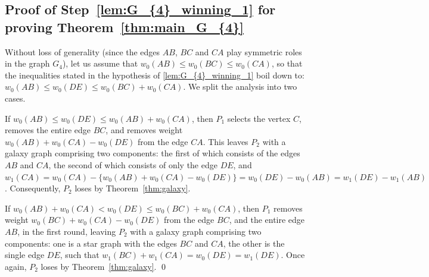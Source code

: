 \documentclass[11pt,reqno]{amsart}
\theoremstyle{definition}
\theoremstyle{definition}
\begin{document}
\subsection{Proof of Step~\ref{lem:G_{4}_winning_1} for proving Theorem~\ref{thm:main_G_{4}}}
Without loss of generality (since the edges $AB$, $BC$ and $CA$ play symmetric roles in the graph $G_{4}$), let us assume that $w_{0}(AB)\leqslant w_{0}(BC)\leqslant w_{0}(CA)$, so that the inequalities stated in the hypothesis of \eqref{lem:G_{4}_winning_1} boil down to: $w_{0}(AB) \leqslant w_{0}(DE) \leqslant w_{0}(BC)+w_{0}(CA)$. We split the analysis into two cases. 

If $w_{0}(AB)\leqslant w_{0}(DE)\leqslant w_{0}(AB)+w_{0}(CA)$, then $P_{1}$ selects the vertex $C$, removes the entire edge $BC$, and removes weight $w_{0}(AB)+w_{0}(CA)-w_{0}(DE)$ from the edge $CA$. This leaves $P_{2}$ with a galaxy graph comprising two components: the first of which consists of the edges $AB$ and $CA$, the second of which consists of only the edge $DE$, and $w_{1}(CA)=w_{0}(CA)-\{w_{0}(AB)+w_{0}(CA)-w_{0}(DE)\}=w_{0}(DE)-w_{0}(AB)=w_{1}(DE)-w_{1}(AB)$. Consequently, $P_{2}$ loses by Theorem~\ref{thm:galaxy}.

If $w_{0}(AB)+w_{0}(CA) < w_{0}(DE) \leqslant w_{0}(BC)+w_{0}(CA)$, then $P_{1}$ removes weight $w_{0}(BC)+w_{0}(CA)-w_{0}(DE)$ from the edge $BC$, and the entire edge $AB$, in the first round, leaving $P_{2}$ with a galaxy graph comprising two components: one is a star graph with the edges $BC$ and $CA$, the other is the single edge $DE$, such that $w_{1}(BC)+w_{1}(CA)=w_{0}(DE)=w_{1}(DE)$. Once again, $P_{2}$ loses by Theorem~\ref{thm:galaxy}. \qed
\end{document}

